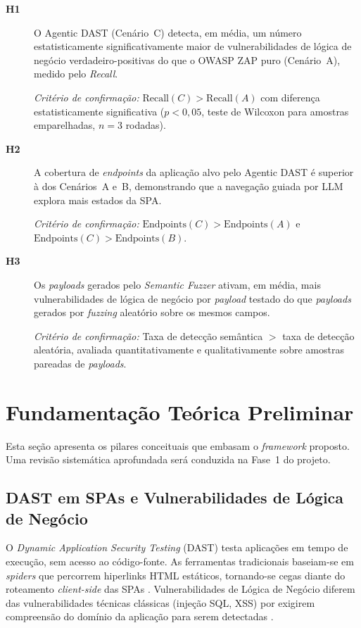 \documentclass[
    12pt,
    openany,
    oneside,
    a4paper,
    brazil
]{abntex2}
\begin{document}
\begin{description}
  \item[\textbf{H1}] O Agentic DAST (Cenário~C) detecta, em média, um
  número estatisticamente significativamente maior de vulnerabilidades
  de lógica de negócio verdadeiro-positivas do que o OWASP ZAP puro
  (Cenário~A), medido pelo \textit{Recall}.

  \textit{Critério de confirmação:} $\text{Recall}(C) > \text{Recall}(A)$
  com diferença estatisticamente significativa ($p < 0{,}05$, teste de
  Wilcoxon para amostras emparelhadas, $n = 3$ rodadas).

  \item[\textbf{H2}] A cobertura de \textit{endpoints} da aplicação
  alvo pelo Agentic DAST é superior à dos Cenários~A e~B, demonstrando
  que a navegação guiada por LLM explora mais estados da SPA.

  \textit{Critério de confirmação:}
  $\text{Endpoints}(C) > \text{Endpoints}(A)$ e
  $\text{Endpoints}(C) > \text{Endpoints}(B)$.

  \item[\textbf{H3}] Os \textit{payloads} gerados pelo \textit{Semantic
  Fuzzer} ativam, em média, mais vulnerabilidades de lógica de negócio
  por \textit{payload} testado do que \textit{payloads} gerados por
  \textit{fuzzing} aleatório sobre os mesmos campos.

  \textit{Critério de confirmação:} Taxa de detecção semântica $>$
  taxa de detecção aleatória, avaliada quantitativamente e
  qualitativamente sobre amostras pareadas de \textit{payloads}.
\end{description}

\chapter{Fundamentação Teórica Preliminar}

Esta seção apresenta os pilares conceituais que embasam o
\textit{framework} proposto. Uma revisão sistemática aprofundada será
conduzida na Fase~1 do projeto.

\section{DAST em SPAs e Vulnerabilidades de Lógica de Negócio}

O \textit{Dynamic Application Security Testing} (DAST) testa
aplicações em tempo de execução, sem acesso ao código-fonte. As
ferramentas tradicionais baseiam-se em \textit{spiders} que percorrem
hiperlinks HTML estáticos, tornando-se cegas diante do roteamento
\textit{client-side} das SPAs \cite{stackhawk2024}. Vulnerabilidades de
Lógica de Negócio diferem das vulnerabilidades técnicas clássicas
(injeção SQL, XSS) por exigirem compreensão do domínio da aplicação
para serem detectadas \cite{portswigger2024, karadbhajne2025}.
\end{document}
